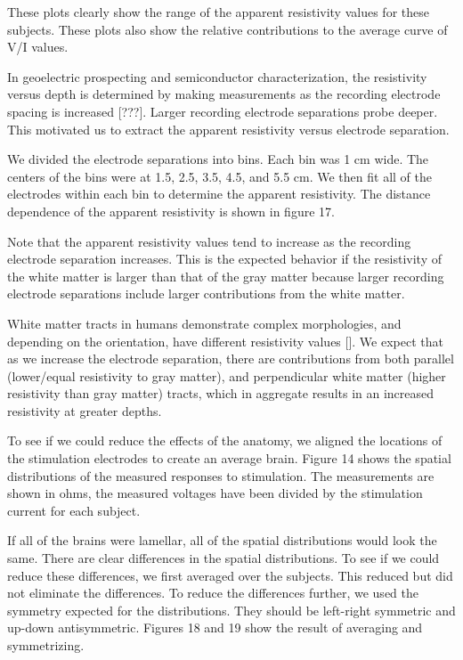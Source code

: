 These plots clearly show the range of the apparent resistivity values for these subjects. 
These plots also show the relative contributions to the average curve of V/I values.


In geoelectric prospecting and semiconductor characterization, the resistivity versus depth is determined by making measurements as the recording electrode spacing is increased [???].
Larger recording electrode separations probe deeper. This motivated us to extract the apparent resistivity versus electrode separation. 

We divided the electrode separations into bins. Each bin was 1 cm wide. The centers of the bins were at 1.5, 2.5, 3.5, 4.5, and 5.5 cm. We then fit all of the electrodes within each bin
to determine the apparent resistivity. The distance dependence of the apparent resistivity is shown in figure 17.

Note that the apparent resistivity values tend to increase as the recording electrode separation increases. This is the expected behavior if the resistivity of the white matter is larger than that of the gray matter because larger recording electrode separations include larger contributions from the white matter.

White matter tracts in humans demonstrate complex morphologies, and depending on the orientation, have different resistivity values []. We expect that as we increase the electrode separation, there are contributions from both parallel (lower/equal resistivity to gray matter), and perpendicular white matter (higher resistivity than gray matter) tracts, which in aggregate results in an increased resistivity at greater depths.

To see if we could reduce the effects of the anatomy, we aligned the locations of the stimulation electrodes to create an average brain. 
Figure 14 shows the spatial distributions of the measured responses to stimulation. The measurements are shown in ohms, the measured voltages 
have been divided by the stimulation current for each subject.

If all of the brains were lamellar, all of the spatial distributions would look the same. There are clear differences in the spatial distributions. 
To see if we could reduce these differences, we first averaged over the subjects. This reduced but did not eliminate the differences. 
To reduce the differences further, we used the symmetry expected for the distributions. They should be left-right symmetric and up-down antisymmetric. 
Figures 18 and 19 show the result of averaging and symmetrizing.

